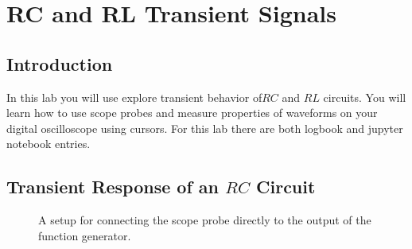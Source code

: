 \chapter{RC and RL Transient Signals}


\section{Introduction}

In this lab you will use explore transient behavior of$RC$ and $RL$ circuits.  You will learn
how to use scope probes and measure properties of waveforms on your digital oscilloscope using cursors.  For this lab there are both logbook and jupyter notebook entries.


%
%


\section{Transient Response of an $RC$ Circuit}

\begin{figure}[htbp]
\begin{center}
\caption{A setup for connecting the scope probe directly to the output of the function generator.}
\label{fig:probe_setup}
\end{center}
\end{figure}

